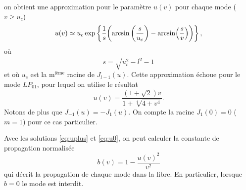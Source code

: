 \documentclass[10pt,letterpaper,twocolumn]{article}
\DeclarePairedDelimiter\autobracket{(}{)}
\newcommand{\br}[1]{\autobracket*{#1}}
\begin{document}
on obtient une approximation pour le paramètre $u(v)$ pour chaque mode ($v \ge u_c$)
\begin{equation}\label{eq:uplus}
	u(v) \simeq u_c \exp\left\{\frac{1}{s}\br{\arcsin{\br{\frac{s}{u_c}}} - \arcsin(\frac{s}{v})}     \right\},
\end{equation}
où 
\begin{equation}
	s = \sqrt{u_c^2 - l^2 - 1}
\end{equation}
et où $u_c$ est la m$^{\text{ième}}$ racine de $J_{l-1}(u)$. Cette approximation échoue pour le mode $LP_{01}$, pour lequel on utilise le résultat\supercite{Gloge1971}
\begin{equation}\label{eq:u0}
	u(v) = \frac{(1 + \sqrt{2})v}{1 + \sqrt[4]{4 + v^4}}.
\end{equation}
Notons de plus que $J_{-1}(u) = -J_1(u)$. On compte la racine $J_{1}(0) = 0$ ($m=1$) pour ce cas particulier. \par
Avec les solutions \eqref{eq:uplus} et \eqref{eq:u0}, on peut calculer la constante de propagation normalisée
\begin{equation}
	b(v) = 1 - \frac{u(v)^2}{v^2}
\end{equation}
qui décrit la propagation de chaque mode dans la fibre. En particulier, lorsque $b=0$ le mode est interdit.\par
\end{document}
